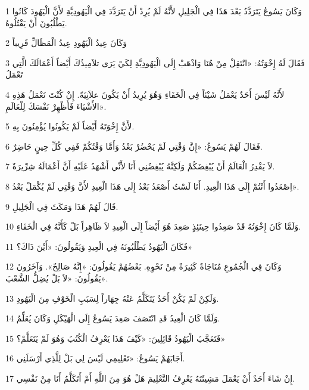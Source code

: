 \par 1 وَكَانَ يَسُوعُ يَتَرَدَّدُ بَعْدَ هَذَا فِي الْجَلِيلِ لأَنَّهُ لَمْ يُرِدْ أَنْ يَتَرَدَّدَ فِي الْيَهُودِيَّةِ لأَنَّ الْيَهُودَ كَانُوا يَطْلُبُونَ أَنْ يَقْتُلُوهُ.
\par 2 وَكَانَ عِيدُ الْيَهُودِ عِيدُ الْمَظَالِّ قَرِيباً
\par 3 فَقَالَ لَهُ إِخْوَتُهُ: «انْتَقِلْ مِنْ هُنَا وَاذْهَبْ إِلَى الْيَهُودِيَّةِ لِكَيْ يَرَى تلاَمِيذُكَ أَيْضاً أَعْمَالَكَ الَّتِي تَعْمَلُ
\par 4 لأَنَّهُ لَيْسَ أَحَدٌ يَعْمَلُ شَيْئاً فِي الْخَفَاءِ وَهُوَ يُرِيدُ أَنْ يَكُونَ علاَنِيَةً. إِنْ كُنْتَ تَعْمَلُ هَذِهِ الأَشْيَاءَ فَأَظْهِرْ نَفْسَكَ لِلْعَالَمِ».
\par 5 لأَنَّ إِخْوَتَهُ أَيْضاً لَمْ يَكُونُوا يُؤْمِنُونَ بِهِ.
\par 6 فَقَالَ لَهُمْ يَسُوعُ: «إِنَّ وَقْتِي لَمْ يَحْضُرْ بَعْدُ وَأَمَّا وَقْتُكُمْ فَفِي كُلِّ حِينٍ حَاضِرٌ.
\par 7 لاَ يَقْدِرُ الْعَالَمُ أَنْ يُبْغِضَكُمْ وَلَكِنَّهُ يُبْغِضُنِي أَنَا لأَنِّي أَشْهَدُ عَلَيْهِ أَنَّ أَعْمَالَهُ شِرِّيرَةٌ.
\par 8 اِصْعَدُوا أَنْتُمْ إِلَى هَذَا الْعِيدِ. أَنَا لَسْتُ أَصْعَدُ بَعْدُ إِلَى هَذَا الْعِيدِ لأَنَّ وَقْتِي لَمْ يُكْمَلْ بَعْدُ».
\par 9 قَالَ لَهُمْ هَذَا وَمَكَثَ فِي الْجَلِيلِ.
\par 10 وَلَمَّا كَانَ إِخْوَتُهُ قَدْ صَعِدُوا حِينَئِذٍ صَعِدَ هُوَ أَيْضاً إِلَى الْعِيدِ لاَ ظَاهِراً بَلْ كَأَنَّهُ فِي الْخَفَاءِ.
\par 11 فَكَانَ الْيَهُودُ يَطْلُبُونَهُ فِي الْعِيدِ وَيَقُولُونَ: «أَيْنَ ذَاكَ؟»
\par 12 وَكَانَ فِي الْجُمُوعِ مُنَاجَاةٌ كَثِيرَةٌ مِنْ نَحْوِهِ. بَعْضُهُمْ يَقُولُونَ: «إِنَّهُ صَالِحٌ». وَآخَرُونَ يَقُولُونَ: «لاَ بَلْ يُضِلُّ الشَّعْبَ».
\par 13 وَلَكِنْ لَمْ يَكُنْ أَحَدٌ يَتَكَلَّمُ عَنْهُ جِهَاراً لِسَبَبِ الْخَوْفِ مِنَ الْيَهُودِ.
\par 14 وَلَمَّا كَانَ الْعِيدُ قَدِ انْتَصَفَ صَعِدَ يَسُوعُ إِلَى الْهَيْكَلِ وَكَانَ يُعَلِّمُ.
\par 15 فَتَعَجَّبَ الْيَهُودُ قَائِلِينَ: «كَيْفَ هَذَا يَعْرِفُ الْكُتُبَ وَهُوَ لَمْ يَتَعَلَّمْ؟»
\par 16 أَجَابَهُمْ يَسُوعُ: «تَعْلِيمِي لَيْسَ لِي بَلْ لِلَّذِي أَرْسَلَنِي.
\par 17 إِنْ شَاءَ أَحَدٌ أَنْ يَعْمَلَ مَشِيئَتَهُ يَعْرِفُ التَّعْلِيمَ هَلْ هُوَ مِنَ اللَّهِ أَمْ أَتَكَلَّمُ أَنَا مِنْ نَفْسِي.
